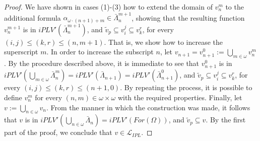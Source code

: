 \documentclass[12pt]{article}
\begin{document}
\begin{proof}
We have shown in cases (1)-(3) how to extend the domain of $v_n^m$ to the additional formula $\alpha_{\omega\cdot (n+1) +m} \in \bar{\Lambda}_n^{m+1}$, showing that the resulting function $v_n^{m+1}$ is in $iPLV'(\bar{\Lambda}_n^{m+1})$, and $\tilde v_p \subseteq v_i^j \subseteq v_k^r$, for every  $(i,j) \leq (k,r) \leq (n,m+1)$. That is, we show how to increase the superscript $m$. In order to increase the subscript $n$, let $v_{n+1}=v_{n+1}^0 := \bigcup_{m \in \omega} v_n^m$. By the procedure described above, it is immediate to see that $v_{n+1}^0$ is in $iPLV'(\bigcup_{m \in \omega} \bar{\Lambda}_n^m) =iPLV'(\bar{\Lambda}_{n+1})= iPLV'(\bar{\Lambda}_{n+1}^0)$, and $\tilde v_p \subseteq v_i^j \subseteq v_k^r$, for every  $(i,j) \leq (k,r) \leq (n+1,0)$. By repeating the process, it is possible to define $v_n^m$ for every $(n,m) \in \omega\times \omega$ with the required properties. Finally, let $v:=\bigcup_{n\in \omega} v_n$. From the manner in which the construction was made, it follows that  $v$ is in $iPLV'(\bigcup_{n \in \omega}\bar{\Lambda}_{n})= iPLV'(For(\Omega))$, and $\tilde v_p \subseteq v$. By the first part of the proof, we conclude that $v \in \mathcal{L}_{IPL}$.
\end{proof}

\end{document}
